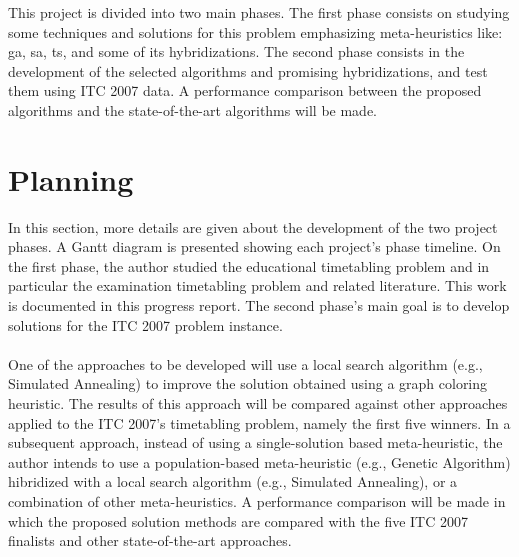 This project is divided into two main phases. The first phase consists on studying some techniques and solutions for this problem emphasizing meta-heuristics like: \gls{ga}, \gls{sa}, \gls{ts}, and some of its hybridizations. The second phase consists in the development of the selected algorithms and promising hybridizations, and test them using ITC 2007 data. A performance comparison between the proposed algorithms and the state-of-the-art algorithms will be made.


\section{Planning}

In this section, more details are given about the development of the two project phases. A Gantt diagram is presented showing each project's phase timeline. On the first phase, the author studied the educational timetabling problem and in particular the examination timetabling problem and related literature. This work is documented in this progress report. The second phase's main goal is to develop solutions for the ITC 2007 problem instance. \\
\\
One of the approaches to be developed will use a local search algorithm (e.g., Simulated Annealing) to improve the solution obtained using a graph coloring heuristic. The results of this approach will be compared against other approaches applied to the ITC 2007’s timetabling problem, namely the first five winners. In a subsequent approach, instead of using a single-solution based meta-heuristic, the author intends to use a population-based meta-heuristic (e.g., Genetic Algorithm) hibridized with a local
search algorithm (e.g., Simulated Annealing), or a combination of other meta-heuristics. A performance comparison will be made in which the proposed solution methods are compared with the five ITC 2007 finalists and other state-of-the-art approaches. 

